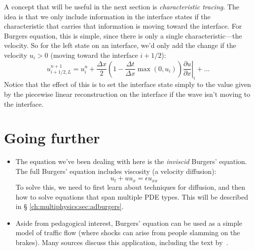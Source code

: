 A concept that will be useful in the next section is {\em
  characteristic tracing}.  The idea is that we only include
information in the interface states if the characteristic that carries
that information is moving toward the interface.  For Burgers equation,
this is simple, since there is only a single characteristic---the velocity.
So for the left state on an interface, we'd only add the change if
the velocity $u_i > 0$ (moving toward the interface $i+1/2$):
\begin{equation}
u^{n+1}_{i+1/2,L}
 = u^n_i + \frac{\Delta x}{2}
   \left ( 1 - \frac{\Delta t}{\Delta x} \max(0, u_i) \right )
   \left . \frac{\partial u}{\partial x} \right |_i + \ldots
\end{equation}
Notice that the effect of this is to set the interface state simply to
the value given by the piecewise linear reconstruction on the interface
if the wave isn't moving to the interface.

\section{Going further}

\begin{itemize}
\item The equation we've been dealing with here is the {\em inviscid}
  Burgers' equation.  The full Burgers' equation includes viscosity (a
  velocity diffusion):
  \begin{equation}
    u_t + u u_x = \epsilon u_{xx}
  \end{equation}
  To solve this, we need to first learn about techniques for
  diffusion, and then how to solve equations that span multiple PDE
  types.  This will be described in \S
  \ref{ch:multiphysics:sec:adburgers}.

\item Aside from pedagogical interest, Burgers' equation can be used
  as a simple model of traffic flow (where shocks can arise from
  people slamming on the brakes).  Many sources discuss this
  application, including the text by~\cite{leveque:2002}.

\end{itemize}
